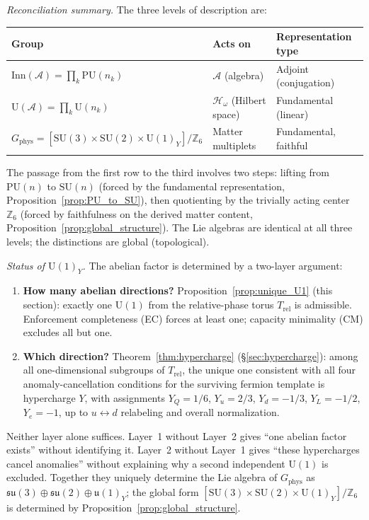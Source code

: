 \documentclass[11pt,a4paper]{article}
\theoremstyle{definition}
\newcommand{\SU}{\mathrm{SU}}
\newcommand{\U}{\mathrm{U}}
\begin{document}
\smallskip\noindent\textit{Reconciliation summary.}\quad
The three levels of description are:
\begin{center}\small
\begin{tabular}{@{}lll@{}}
\toprule
\textbf{Group} & \textbf{Acts on} & \textbf{Representation type} \\
\midrule
$\mathrm{Inn}(\mathcal{A}) = \prod_k \mathrm{PU}(n_k)$ &
  $\mathcal{A}$ (algebra) & Adjoint (conjugation) \\
$\mathrm{U}(\mathcal{A}) = \prod_k \mathrm{U}(n_k)$ &
  $\mathcal{H}_\omega$ (Hilbert space) & Fundamental (linear) \\
$G_{\mathrm{phys}} = [\SU(3){\times}\SU(2){\times}\U(1)_Y]/\mathbb{Z}_6$ &
  Matter multiplets & Fundamental, faithful \\
\bottomrule
\end{tabular}
\end{center}
The passage from the first row to the third involves two steps: lifting
from $\mathrm{PU}(n)$ to $\SU(n)$ (forced by the fundamental
representation, Proposition~\ref{prop:PU_to_SU}), then quotienting by
the trivially acting center $\mathbb{Z}_6$ (forced by faithfulness on
the derived matter content, Proposition~\ref{prop:global_structure}).
The Lie algebras are identical at all three levels; the distinctions are
global (topological).

\smallskip\noindent\textit{Status of $\U(1)_Y$.}\quad
The abelian factor is determined by a two-layer argument:
\begin{enumerate}[nosep,label=\textbf{Layer \arabic*:}]
  \item \textbf{How many abelian directions?}\quad
  Proposition~\ref{prop:unique_U1} (this section): exactly one $\U(1)$
  from the relative-phase torus $T_{\mathrm{rel}}$ is admissible.
  Enforcement completeness (EC) forces at least one; capacity
  minimality (CM) excludes all but one.

  \item \textbf{Which direction?}\quad
  Theorem~\ref{thm:hypercharge} (\S\ref{sec:hypercharge}): among all
  one-dimensional subgroups of $T_{\mathrm{rel}}$, the unique one
  consistent with all four anomaly-cancellation conditions for the
  surviving fermion template is hypercharge $Y$, with assignments
  $Y_Q = 1/6$, $Y_u = 2/3$, $Y_d = -1/3$, $Y_L = -1/2$, $Y_e = -1$,
  up to $u \leftrightarrow d$ relabeling and overall normalization.
\end{enumerate}
Neither layer alone suffices.  Layer~1 without Layer~2 gives ``one
abelian factor exists'' without identifying it.  Layer~2 without
Layer~1 gives ``these hypercharges cancel anomalies'' without
explaining why a second independent $\U(1)$ is excluded.  Together
they uniquely determine the Lie algebra of
$G_{\mathrm{phys}}$ as $\mathfrak{su}(3) \oplus \mathfrak{su}(2)
\oplus \mathfrak{u}(1)_Y$; the global form
$[\SU(3) \times \SU(2) \times \U(1)_Y] / \mathbb{Z}_6$ is determined
by Proposition~\ref{prop:global_structure}.
\end{document}
